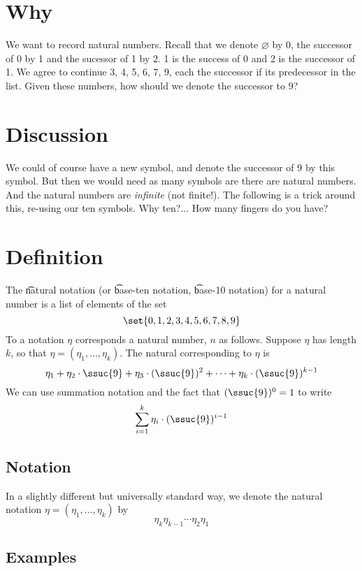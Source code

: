 
\section*{Why}

We want to record natural numbers.
Recall that we denote $\varnothing$ by 0, the successor of 0 by 1 and the sucessor of 1 by 2.
1 is the success of 0 and 2 is the successor of 1.
We agree to continue 3, 4, 5, 6, 7, 9, each the successor if its predecessor in the list.
Given these numbers, how should we denote the successor to 9?

\section*{Discussion}

We could of course have a new symbol, and denote the successor of 9 by this symbol.
But then we would need as many symbols are there are natural numbers.
And the natural numbers are \textit{infinite} (not finite!).
The following is a trick around this, re-using our ten symbols.
Why ten?...
How many fingers do you have?

\section*{Definition}

The \t{natural notation} (or \t{base-ten notation}, \t{base-10 notation}) for a natural number is a list of elements of the set
\[
\set{0, 1, 2, 3, 4, 5, 6, 7, 8, 9}
\]
To a notation $\eta $ corresponds a natural number, $n$ as follows.
Suppose $\eta $ has length $k$, so that $\eta  = (\eta _1, \dots , \eta _k)$.
The natural corresponding to $\eta $ is
\[
\eta _1 + \eta _2\cdot \ssuc{9} + \eta _3\cdot (\ssuc{9})^2 + \cdots + \eta _k\cdot  (\ssuc{9})^{k-1}
\]
We can use summation notation and the fact that $(\ssuc{9})^0 = 1$ to write
\[
\sum_{i = 1}^{k} \eta _i\cdot (\ssuc{9})^{i-1}
\]

\subsection*{Notation}

In a slightly different but universally standard way, we denote the natural notation $\eta  = (\eta _1, \dots , \eta _k)$ by
\[
\eta _k\eta _{k-1} \cdots \eta _2\eta _1
\]

\subsection*{Examples}


